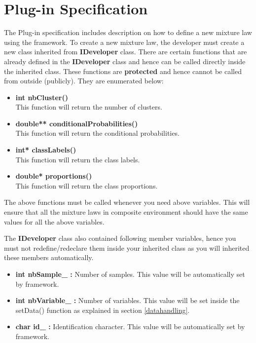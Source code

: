 \documentclass[a4paper,11pt]{article}
\begin{document}
\section{Plug-in Specification}

The Plug-in specification includes description on how to define a new mixture law using the framework.
To create a new mixture law, the developer 
must create a new class inherited from {\bf IDeveloper} class.
There are certain functions that are already defined in the {\bf IDeveloper} 
class and hence can be called directly inside the inherited class. These functions are {\bf protected} and hence cannot be called from outside (publicly). 
They are enumerated below:
\begin{itemize}
 \item {\bf int nbCluster()}\\
This function will return the number of clusters.
\item {\bf double** conditionalProbabilities()}\\
This function will return the conditional probabilities. 
\item {\bf int* classLabels()}\\
This function will return the class labels.
\item {\bf double* proportions()}\\
This function will return the class proportions.
\end{itemize}

The above functions must be called whenever you need above variables. This will ensure that all the mixture laws in composite environment should have the same
values for all the above variables.

The {\bf IDeveloper} class also contained following member variables, hence you must not redefine/redeclare them inside your inherited class as you will inherited these members automatically.
\begin{itemize}
 \item {\bf int nbSample\_ : }Number of samples. This value will be automatically set by framework.
\item {\bf int nbVariable\_ : }Number of variables. This value will be set inside the setData() function as explained in section \ref{datahandling}. 
\item {\bf char id\_ : }Identification character. This value will be automatically set by framework. 
\end{itemize}
\end{document}
